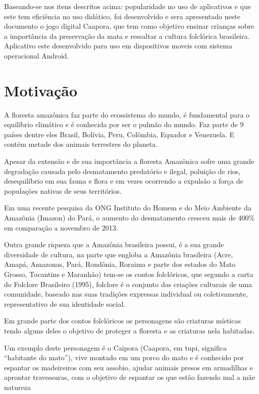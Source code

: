 Baseando-se nos itens descritos acima: popularidade no uso de aplicativos e que este tem eficiência no uso didático, foi desenvolvido e sera apresentado neste documento o jogo digital Caapora, que tem como objetivo ensinar crianças sobre a importância da preservação da mata e ressaltar a cultura folclórica brasileira.
Aplicativo este desenvolvido para uso em  dispositivos moveis com sistema operacional Android.

\section{Motivação}
\label{cap:motivacao}

A floresta amazônica faz parte do ecossistema do mundo, é fundamental para o equilíbrio climático e é conhecida por ser o pulmão do mundo. Faz parte de 9 países dentre eles Brasil, Bolívia, Peru, Colômbia, Equador e Venezuela. E contém metade dos animais terrestres do planeta.

Apesar da extensão e de sua importância a floresta Amazônica sofre uma grande degradação causada pelo desmatamento predatório e ilegal, poluição de rios, desequilíbrio em sua fauna e flora e em vezes ocorrendo a expulsão a força de populações nativas de seus territórios.

Em uma recente pesquisa da ONG Instituto do Homem e do Meio Ambiente da Amazônia (Imazon) do Pará, o aumento do desmatamento cresceu mais de 400\% em comparação a novembro de 2013.

Outra grande riqueza que a Amazônia brasileira possui, é a sua grande diversidade de cultura, na parte que engloba a Amazônia brasileira (Acre, Amapá, Amazonas, Pará, Rondônia, Roraima e parte dos estados do Mato Grosso, Tocantins e Maranhão) tem-se os contos folclóricos, que segundo a carta do Folclore Brasileiro (1995), folclore é o conjunto das criações culturais de uma comunidade, baseado nas suas tradições expressas individual ou coletivamente, representativo de sua identidade social.

Em grande parte dos contos folclóricos os personagens são criaturas místicas tendo alguns deles o objetivo de proteger a floresta e as criaturas nela habitadas.

Um exemplo deste personagem é o Caipora (Caapora, em tupi, significa “habitante do mato”), vive montado em um porco do mato e é conhecido por espantar os madeireiros com seu assobio, ajudar animais presos em armadilhas e aprontar travessuras, com o objetivo de espantar os que estão fazendo mal a mãe natureza

